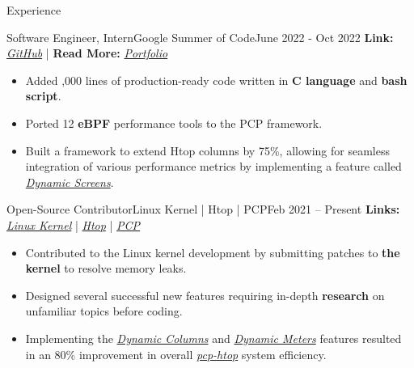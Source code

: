 \documentclass[]{Sohaib-Mohamed}
\begin{document}
\makeheader

\begin{cvsection}{Experience}

   \begin{cvsubsection}{Software Engineer, Intern}{Google Summer of Code}{June 2022 - Oct 2022}
      \textbf{Link:} \href{https://gist.github.com/smalinux/e869b376b5c77cacdcda4cb14f027632}{\textit{GitHub}} | \textbf{Read More:} \href{https://gist.github.com/smalinux/2e9c5537fdac65501a655280352c9c15#google-summer-of-code-2022}{\textit{Portfolio}}
      \begin{itemize}
         \item Added ,000 lines of production-ready code written in \textbf{C language} and \textbf{bash script}.
         \item Ported 12 \textbf{eBPF} performance tools to the PCP framework.
         \item Built a framework to extend Htop columns by 75\%, allowing for seamless integration of various performance metrics by implementing a feature called \href{https://github.com/htop-dev/htop/pull/1102}{\textit{Dynamic Screens}}.
      \end{itemize}
   \end{cvsubsection}

   \begin{cvsubsection}{Open-Source Contributor}{Linux Kernel | Htop | PCP}{Feb 2021 -- Present}
      \textbf{Links:} \href{https://git.kernel.org/pub/scm/linux/kernel/git/next/linux-next.git/log/?qt=grep&q=sohaib}{\textit{Linux Kernel}} | \href{https://github.com/htop-dev/htop/commits?author=smalinux}{\textit{Htop}} | \href{https://github.com/performancecopilot/pcp/commits?author=smalinux}{\textit{PCP}}
      \begin{itemize}
         \item Contributed to the Linux kernel development by submitting patches to \textbf{the kernel} to resolve memory leaks.
         \item Designed several successful new features requiring in-depth \textbf{research} on unfamiliar topics before coding.
         \item Implementing the \href{https://github.com/htop-dev/htop/pull/707}{\textit{Dynamic Columns}} and \href{https://github.com/htop-dev/htop/pull/669}{\textit{Dynamic Meters}} features resulted in an 80\% improvement in overall \href{https://man.archlinux.org/man/pcp-htop.1.en}{\textit{pcp-htop}} system efficiency.
      \end{itemize}
   \end{cvsubsection}
\end{cvsection}
\end{document}
